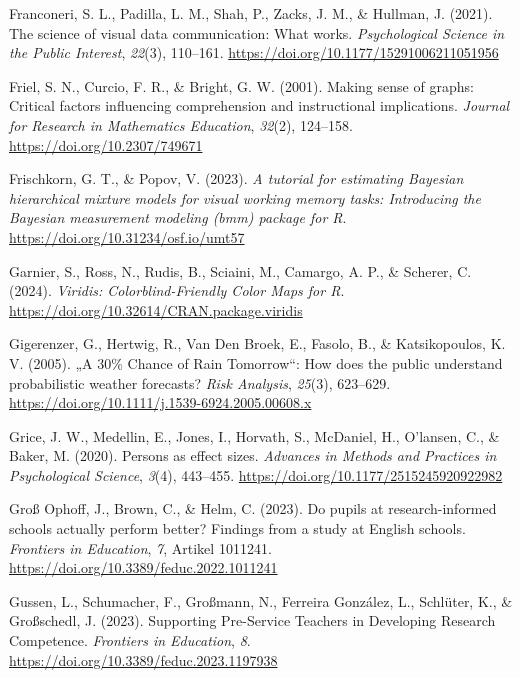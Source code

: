 \documentclass[
  man,
  floatsintext,
  longtable,
  nolmodern,
  notxfonts,
  notimes,
  colorlinks=true,linkcolor=blue,citecolor=blue,urlcolor=blue]{apa7}
\newlength{\cslhangindent}
\newenvironment{CSLReferences}[2] %
 {\begin{list}{}{%
  \setlength{\itemindent}{0pt}
  \setlength{\leftmargin}{0pt}
  \setlength{\parsep}{0pt}
  \ifodd #1
   \setlength{\leftmargin}{\cslhangindent}
   \setlength{\itemindent}{-1\cslhangindent}
  \fi
  \setlength{\itemsep}{#2\baselineskip}}}
 {\end{list}}
\begin{document}
\begin{CSLReferences}{1}{0}
Franconeri, S. L., Padilla, L. M., Shah, P., Zacks, J. M., \& Hullman,
J. (2021). The science of visual data communication: What works.
\emph{Psychological Science in the Public Interest}, \emph{22}(3),
110--161. \url{https://doi.org/10.1177/15291006211051956}

Friel, S. N., Curcio, F. R., \& Bright, G. W. (2001). Making sense of
graphs: Critical factors influencing comprehension and instructional
implications. \emph{Journal for Research in Mathematics Education},
\emph{32}(2), 124--158. \url{https://doi.org/10.2307/749671}

Frischkorn, G. T., \& Popov, V. (2023). \emph{A tutorial for estimating
{Bayesian} hierarchical mixture models for visual working memory tasks:
{Introducing} the {Bayesian} measurement modeling (bmm) package for
{R}}. \url{https://doi.org/10.31234/osf.io/umt57}

Garnier, S., Ross, N., Rudis, B., Sciaini, M., Camargo, A. P., \&
Scherer, C. (2024). \emph{Viridis: {Colorblind-Friendly Color Maps} for
{R}}. \url{https://doi.org/10.32614/CRAN.package.viridis}

Gigerenzer, G., Hertwig, R., Van Den Broek, E., Fasolo, B., \&
Katsikopoulos, K. V. (2005). {„A {30\%} Chance of Rain Tomorrow``}: How
does the public understand probabilistic weather forecasts? \emph{Risk
Analysis}, \emph{25}(3), 623--629.
\url{https://doi.org/10.1111/j.1539-6924.2005.00608.x}

Grice, J. W., Medellin, E., Jones, I., Horvath, S., McDaniel, H.,
O'lansen, C., \& Baker, M. (2020). Persons as effect sizes.
\emph{Advances in Methods and Practices in Psychological Science},
\emph{3}(4), 443--455. \url{https://doi.org/10.1177/2515245920922982}

Groß Ophoff, J., Brown, C., \& Helm, C. (2023). Do pupils at
research-informed schools actually perform better? Findings from a study
at English schools. \emph{Frontiers in Education}, \emph{7}, Artikel
1011241. \url{https://doi.org/10.3389/feduc.2022.1011241}

Gussen, L., Schumacher, F., Großmann, N., Ferreira González, L.,
Schlüter, K., \& Großschedl, J. (2023). Supporting Pre-Service Teachers
in Developing Research Competence. \emph{Frontiers in Education},
\emph{8}. \url{https://doi.org/10.3389/feduc.2023.1197938}


\end{CSLReferences}
\end{document}
